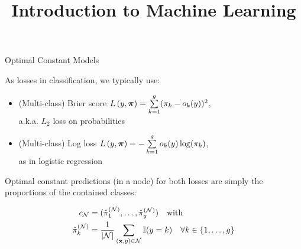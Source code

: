 \documentclass[11pt,compress,t,notes=noshow, xcolor=table]{beamer}
\title{Introduction to Machine Learning}
\begin{document}

\begin{vbframe}{Optimal Constant Models}

As losses in classification, we typically use: 

\begin{itemize}
\item (Multi-class) Brier score $\Lpiv =  \sumkg (\pik - o_k(y))^2$,\\ a.k.a. $L_2$ loss on probabilities
\item (Multi-class) Log loss $\Lpiv =  - \sumkg o_k(y) \log(\pik)$, \\
as in logistic regression
\end{itemize}


Optimal constant predictions (in a node) for both losses are simply the proportions of the contained classes:

\begin{align*}
c_{\Np} &= (\pikNh[1], \dots, \pikNh[g]) \quad \text{with}\\
\pikNh &= \frac{1}{|\Np|} \sum\limits_{(\xv,y) \in \Np} \I(y = k) \quad \forall k \in \gset
\end{align*}


\end{vbframe}
\end{document}
